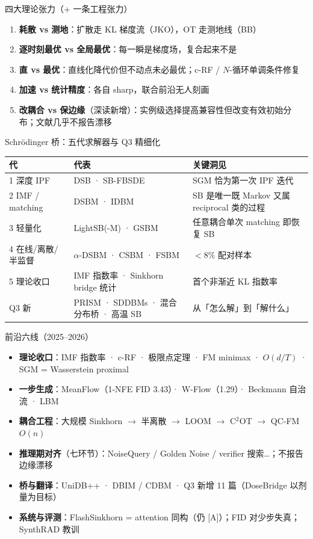 \documentclass[10pt,aspectratio=169]{beamer}
\begin{document}
\begin{frame}{四大理论张力（+ 一条工程张力）}
\begin{enumerate}
\item \textbf{耗散 vs 测地}：扩散走 KL 梯度流（JKO），OT 走测地线（BB）
\item \textbf{逐时刻最优 vs 全局最优}：每一瞬是梯度场，复合起来不是
\item \textbf{直 vs 最优}：直线化降代价但不动点未必最优；c-RF / $N$-循环单调条件修复
\item \textbf{加速 vs 统计精度}：各自 sharp，联合前沿无人刻画
\item \textcolor{hl}{\textbf{改耦合 vs 保边缘}}（深读新增）：实例级选择提高兼容性但改变有效初始分布；文献几乎不报告漂移
\end{enumerate}
\end{frame}

\begin{frame}{Schrödinger 桥：五代求解器与 Q3 精细化}
\small
\begin{tabular}{p{}p{}p{}}\toprule
代 & 代表 & 关键洞见 \\ \midrule
1 深度 IPF & DSB · SB-FBSDE & SGM 恰为第一次 IPF 迭代 \\
2 IMF / matching & DSBM · IDBM & SB 是唯一既 Markov 又属 reciprocal 类的过程 \\
3 轻量化 & LightSB(-M) · GSBM & 任意耦合单次 matching 即恢复 SB \\
4 在线/离散/半监督 & $\alpha$-DSBM · CSBM · FSBM & $<8\%$ 配对样本 \\
5 理论收口 & IMF 指数率 · Sinkhorn bridge 统计 & 首个非渐近 KL 指数率 \\
\textcolor{hl}{Q3 新} & PRISM · SDDBMs · 混合分布桥 · 高温 SB & 从「怎么解」到「解什么」 \\ \bottomrule
\end{tabular}
\end{frame}

\begin{frame}{前沿六线（2025--2026）}
\begin{itemize}
\item \textbf{理论收口}：IMF 指数率 · c-RF · 极限点定理 · FM minimax · $O(d/T)$ · SGM = Wasserstein proximal
\item \textbf{一步生成}：MeanFlow（1-NFE FID 3.43）· W-Flow（1.29）· Beckmann 自治流 · LBM
\item \textbf{耦合工程}：大规模 Sinkhorn $\to$ 半离散 $\to$ LOOM $\to$ C$^2$OT $\to$ \textcolor{hl}{QC-FM $O(n)$}
\item \textbf{推理期对齐}（七环节）：NoiseQuery / Golden Noise / verifier 搜索…；\textcolor{bad}{不报告边缘漂移}
\item \textbf{桥与翻译}：UniDB++ · DBIM / CDBM · Q3 新增 11 篇（DoseBridge 以剂量为目标）
\item \textbf{系统与评测}：FlashSinkhorn = attention 同构（仍 [A]）；FID 对少步失真；SynthRAD 教训
\end{itemize}
\end{frame}
\end{document}
